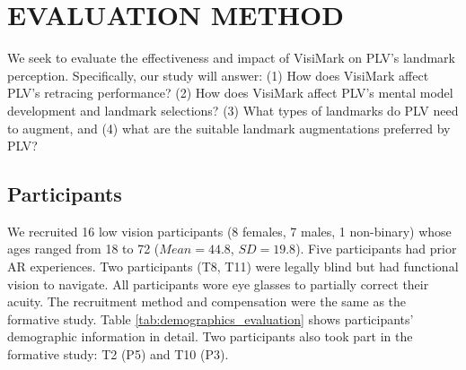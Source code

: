 \section{EVALUATION METHOD} \label{sec:eval}
We seek to evaluate the effectiveness and impact of VisiMark on PLV's landmark perception. Specifically, our study will answer: (1) How does VisiMark affect PLV's retracing performance? (2) How does VisiMark affect PLV's mental model development and landmark selections? (3) What types of landmarks do PLV need to augment, and (4) what are the suitable landmark augmentations preferred by PLV? %

\subsection{Participants}
We recruited 16 low vision participants (8 females, 7 males, 1 non-binary) whose ages ranged from 18 to 72 ($Mean = 44.8$, $SD = 19.8$). Five participants had prior AR experiences. Two participants (T8, T11) were legally blind but had functional vision to navigate. All participants wore eye glasses to partially correct their acuity. The recruitment method and compensation were the same as the formative study. Table \ref{tab:demographics_evaluation} shows participants' demographic information in detail. Two participants also took part in the formative study: T2 (P5) and T10 (P3).


